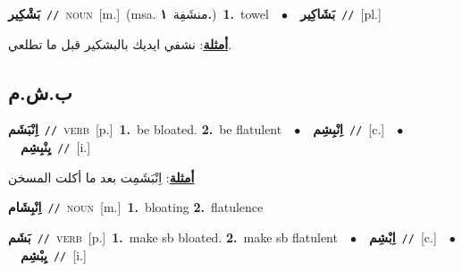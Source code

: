 \documentclass[10pt,a4paper,twoside]{article} %
\begin{document}
\begin{multicols}{2}
{\setlength\topsep{0pt}\textbf{\foreignlanguage{arabic}{بَشْكِير}}\ {\color{gray}\texttt{//}\color{black}}\ \textsc{noun}\ [m.]\ \color{gray}(msa. \foreignlanguage{arabic}{منشَفِة}~\foreignlanguage{arabic}{\textbf{١.}})\color{black}\ \textbf{1.}~towel\ \ $\bullet$\ \ \setlength\topsep{0pt}\textbf{\foreignlanguage{arabic}{بَشَاكِير}}\ {\color{gray}\texttt{//}\color{black}}\ [pl.]\  \begin{flushright}\color{gray}\foreignlanguage{arabic}{\textbf{\underline{\foreignlanguage{arabic}{أمثلة}}}: نشفي ايديك بالبشكير قبل ما تطلعي.}\end{flushright}\color{black}} \vspace{2mm}

\vspace{-3mm}
\subsection*{\color{blue}\foreignlanguage{arabic}{ب.ش.م}\color{blue}{}} 

{\setlength\topsep{0pt}\textbf{\foreignlanguage{arabic}{اِنْبَشَم}}\ {\color{gray}\texttt{//}\color{black}}\ \textsc{verb}\ [p.]\ \textbf{1.}~be bloated.  \textbf{2.}~be flatulent\ \ $\bullet$\ \ \setlength\topsep{0pt}\textbf{\foreignlanguage{arabic}{اِنْبِشِم}}\ {\color{gray}\texttt{//}\color{black}}\ [c.]\ \ $\bullet$\ \ \setlength\topsep{0pt}\textbf{\foreignlanguage{arabic}{يِنْبِشِم}}\ {\color{gray}\texttt{//}\color{black}}\ [i.]\  \begin{flushright}\color{gray}\foreignlanguage{arabic}{\textbf{\underline{\foreignlanguage{arabic}{أمثلة}}}: اِنْبَشَمِت بعد ما أكلت المسخن}\end{flushright}\color{black}} \vspace{2mm}

{\setlength\topsep{0pt}\textbf{\foreignlanguage{arabic}{اِنْبِشَام}}\ {\color{gray}\texttt{//}\color{black}}\ \textsc{noun}\ [m.]\ \textbf{1.}~bloating  \textbf{2.}~flatulence\ } \vspace{2mm}

{\setlength\topsep{0pt}\textbf{\foreignlanguage{arabic}{بَشَم}}\ {\color{gray}\texttt{//}\color{black}}\ \textsc{verb}\ [p.]\ \textbf{1.}~make sb bloated.  \textbf{2.}~make sb flatulent\ \ $\bullet$\ \ \setlength\topsep{0pt}\textbf{\foreignlanguage{arabic}{اِبْشِم}}\ {\color{gray}\texttt{//}\color{black}}\ [c.]\ \ $\bullet$\ \ \setlength\topsep{0pt}\textbf{\foreignlanguage{arabic}{يِبْشِم}}\ {\color{gray}\texttt{//}\color{black}}\ [i.]\ } \vspace{2mm}


\end{multicols}
\end{document}
